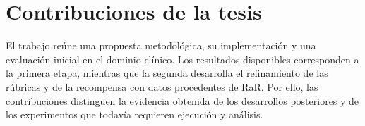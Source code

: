 \chapter{Contribuciones de la tesis}
\label{ch:contribuciones}

El trabajo reúne una propuesta metodológica, su implementación y una evaluación inicial en el dominio clínico. Los resultados disponibles corresponden a la primera etapa, mientras que la segunda desarrolla el refinamiento de las rúbricas y de la recompensa con datos procedentes de RaR. Por ello, las contribuciones distinguen la evidencia obtenida de los desarrollos posteriores y de los experimentos que todavía requieren ejecución y análisis.










